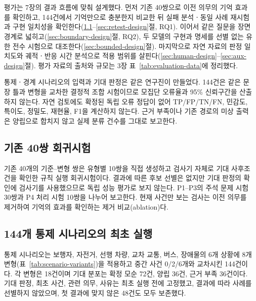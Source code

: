 \section{}
\label{sec:experiments}

\begin{revision}

평가는 7장의 결과 흐름에 맞춰 설계했다. 먼저 기존 40쌍으로 이전 의무의 기억 효과를 확인하고, 144건에서 기억만으로 충분한지 비교한 뒤 실패 분석ㆍ동일 사례 재시험과 구현 일치성을 확인한다(\ref{sec:legacy-test}--\ref{sec:retest-design}절, RQ1). 이어서 같은 질문을 장면 경계로 넓히고(\ref{sec:boundary-design}절, RQ2), 두 모델의 구현과 명세를 선별 없는 유한 전수 시험으로 대조한다(\ref{sec:bounded-design}절). 마지막으로 자연 자료의 판정 일치도와 궤적ㆍ반응 시간 분석으로 적용 범위를 살핀다(\ref{sec:human-design}--\ref{sec:aux-design}절). 평가 자료의 출처와 규모는 3장 표~\ref{tab:evaluation-data}에 정리했다.

통제ㆍ경계 시나리오의 입력과 기대 판정은 같은 연구진이 만들었다. 144건은 같은 문장 틀과 변형을 교차한 결정적 조합 시험이므로 모집단 오류율과 95\% 신뢰구간을 산출하지 않는다. 자연 검토에도 확정된 독립 오류 정답이 없어 TP/FP/TN/FN, 민감도, 특이도, 정밀도, 재현율, F1을 계산하지 않는다. 근거 부족이나 기존 경로의 미상 출력은 양립으로 합치지 않고 실제 분류 건수를 그대로 보고한다.

\subsection{기존 40쌍 회귀시험}
\label{sec:legacy-test}
기존 40개의 기준--변형 쌍은 유형별 10쌍을 직접 생성하고 검사기 자체로 기대 사후조건을 확인한 규칙 실행 회귀시험이다. 결과에 따른 후보 선별은 없지만 기대 판정의 확인에 검사기를 사용했으므로 독립 성능 평가로 보지 않는다. P1--P3의 주석 문제 시험 30쌍과 P4 처리 시험 10쌍을 나누어 보고한다. 현재 사건만 보는 검사는 이전 의무를 제거하여 기억의 효과를 확인하는 제거 비교(ablation)다.

\subsection{144개 통제 시나리오의 최초 실행}
\label{sec:scenario-design}
통제 시나리오는 보행자, 자전거, 선행 차량, 교차 교통, 버스, 장애물의 6개 상황에 8개 변형(표~\ref{tab:scenario-variants})을 적용하고 중간 사건 0/2/6개와 교차시킨 144건이다. 각 변형은 18건이며 기대 분포는 확정 모순 72건, 양립 36건, 근거 부족 36건이다. 기대 판정, 최초 사건, 관련 의무, 사유는 최초 실행 전에 고정했고, 결과에 따라 사례를 선별하지 않았으며, 첫 결과에 맞지 않은 48건도 모두 보존했다.


\end{revision}
